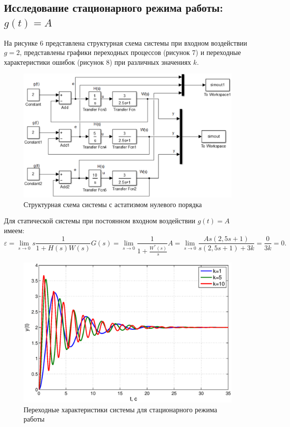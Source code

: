 \documentclass[12pt,a4paper]{article}
\begin{document}
\subsection{Исследование стационарного режима работы: $g(t)=A$} 
На рисунке 6 представлена структурная схема системы при входном воздействии \\$g=2$, представлены графики переходных процессов (рисунок 7) и переходные характеристики ошибок (рисунок 8) при различных значениях $k$. 
\begin{figure}[H]
	\centering
	\includegraphics[width=0.8\linewidth]{cxema2.eps}
	\caption{Структурная схема системы с астатизмом нулевого порядка}
\end{figure}
Для статической системы при постоянном входном воздействии $g(t)=A$ имеем:
\begin{equation}
    \varepsilon = \lim_{s\to0} s\frac{1}{1+H(s)W(s)}G(s) = \lim_{s\to0} \frac{1}{1+\displaystyle{\frac{W^*(s)}{s}}}A = \lim_{s\to0} \frac{As(2,5s+1)}{s(2,5s+1)+3k} = \frac{0}{3k} = 0.
\end{equation}
\begin{figure}[H]
	\centering
	\includegraphics[width=1\linewidth]{2.1.1.eps}
	\caption{Переходные характеристики системы для стационарного режима работы}
\end{figure}
\end{document}

